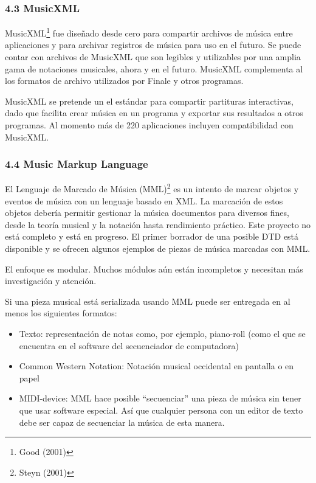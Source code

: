 \documentclass[]{article}
\begin{document}
\hypertarget{musicxml}{%
\subsubsection{4.3 MusicXML}\label{musicxml}}

MusicXML\footnote{Good (2001)} fue diseñado desde cero para compartir
archivos de música entre aplicaciones y para archivar registros de
música para uso en el futuro. Se puede contar con archivos de MusicXML
que son legibles y utilizables por una amplia gama de notaciones
musicales, ahora y en el futuro. MusicXML complementa al los formatos de
archivo utilizados por Finale y otros programas.

MusicXML se pretende un el estándar para compartir partituras
interactivas, dado que facilita crear música en un programa y exportar
sus resultados a otros programas. Al momento más de 220 aplicaciones
incluyen compatibilidad con MusicXML.

\hypertarget{music-markup-language}{%
\subsubsection{4.4 Music Markup Language}\label{music-markup-language}}

El Lenguaje de Marcado de Música (MML)\footnote{Steyn (2001)} es un
intento de marcar objetos y eventos de música con un lenguaje basado en
XML. La marcación de estos objetos debería permitir gestionar la música
documentos para diversos fines, desde la teoría musical y la notación
hasta rendimiento práctico. Este proyecto no está completo y está en
progreso. El primer borrador de una posible DTD está disponible y se
ofrecen algunos ejemplos de piezas de música marcadas con MML.

El enfoque es modular. Muchos módulos aún están incompletos y necesitan
más investigación y atención.

Si una pieza musical está serializada usando MML puede ser entregada en
al menos los siguientes formatos:

\begin{itemize}
\item
  Texto: representación de notas como, por ejemplo, piano-roll (como el
  que se encuentra en el software del secuenciador de computadora)
\item
  Common Western Notation: Notación musical occidental en pantalla o en
  papel
\item
  MIDI-device: MML hace posible ``secuenciar'' una pieza de música sin
  tener que usar software especial. Así que cualquier persona con un
  editor de texto debe ser capaz de secuenciar la música de esta manera.
\end{itemize}
\end{document}

